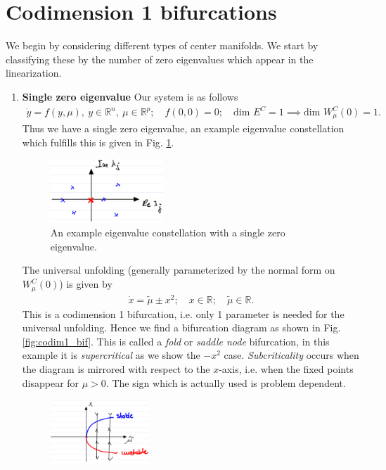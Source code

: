 \section{Codimension 1 bifurcations}
We begin by considering different types of center manifolds. We start by classifying these by the number of zero eigenvalues which appear in the linearization.
\begin{enumerate}
	\item \textbf{Single zero eigenvalue} Our system is as follows
		\begin{align}
			\dot{y} = f(y, \mu),\ y \in \mathbb{R}^{n},\ \mu\in \mathbb{R}^{p};\quad f(0,0)=0;\quad  \textrm{dim }E^{C}=1\implies  \textrm{dim } W^{C}_{\mu }(0)=1.  
		\end{align}
		Thus we have a single zero eigenvalue, an example eigenvalue constellation which fulfills this is given in Fig. \ref{fig:1zero_eigv}.
		\begin{figure}[h!]
			\centering
			\includegraphics[width=0.4\textwidth]{figures/ch3/12onezero_eigv.png}
			\caption{An example eigenvalue constellation with a single zero eigenvalue.}
			\label{fig:1zero_eigv}
		\end{figure}
		The universal unfolding (generally parameterized by the normal form on $W^{C}_{\mu }(0)$) is given by
		\begin{align}
			\boxed{
				\dot{x} = \tilde{\mu }\pm x^2;\quad x \in \mathbb{R};\quad \tilde{\mu } \in\mathbb{R}.
			}
		\end{align}
		This is a codimension 1 bifurcation, i.e. only 1 parameter is needed for the universal unfolding. Hence we find a bifurcation diagram as shown in Fig. \ref{fig:codim1_bif}. This is called a \emph{fold} or \emph{saddle node} bifurcation, in this example it is \emph{supercritical} as we show the $-x^2$ case. \emph{Subcriticality} occurs when the diagram is mirrored with respect to the $x$-axis, i.e. when the fixed points disappear for $\mu > 0$. The sign which is actually used is problem dependent.
		\begin{figure}[h!]
			\centering
			\includegraphics[width=0.35\textwidth]{figures/ch3/13codim1_bif.png}

\end{figure}
\end{enumerate}
